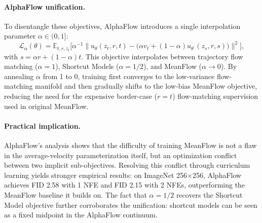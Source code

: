 \paragraph{AlphaFlow unification.} To disentangle these objectives, AlphaFlow introduces a single interpolation parameter $\alpha \in (0,1]$:
\begin{equation}
    \mathcal{L}_\alpha(\theta) = \mathbb{E}_{t,r,z_t} \Big[ \alpha^{-1} \big\| u_\theta(z_t, r, t) - \big( \alpha v_t + (1-\alpha) u_{\theta^\text{-}}(z_s, r, s) \big) \big\|^2 \Big],
\end{equation}
with $s = \alpha r + (1-\alpha)t$. This objective interpolates between trajectory flow matching ($\alpha=1$), Shortcut Models ($\alpha=1/2$), and MeanFlow ($\alpha \to 0$). By annealing $\alpha$ from 1 to 0, training first converges to the low-variance flow-matching manifold and then gradually shifts to the low-bias MeanFlow objective, reducing the need for the expensive border-case ($r=t$) flow-matching supervision used in original MeanFlow.

\paragraph{Practical implication.} AlphaFlow's analysis shows that the difficulty of training MeanFlow is not a flaw in the average-velocity parameterization itself, but an optimization conflict between two implicit sub-objectives. Resolving this conflict through curriculum learning yields stronger empirical results: on ImageNet 256$\times$256, AlphaFlow achieves FID 2.58 with 1 NFE and FID 2.15 with 2 NFEs, outperforming the MeanFlow baseline it builds on. The fact that $\alpha = 1/2$ recovers the Shortcut Model objective further corroborates the unification: shortcut models can be seen as a fixed midpoint in the AlphaFlow continuum.

